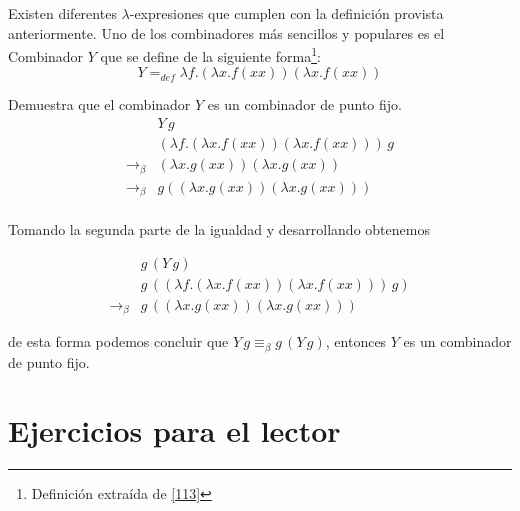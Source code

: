               
                    \begin{definition}[Combinador $Y$] Existen diferentes $\lambda$-expresiones que cumplen con la definición provista anteriormente. Uno de los combinadores más sencillos y populares es el Combinador $Y$ que se define de la siguiente forma\footnote{Definición extraída de \hyperlink{113}{[113]}}:
                        $$Y =_{def} \lambda f.(\lambda x.f(xx))(\lambda x.f(xx))$$
                    \end{definition}
    
                    \begin{exercise} Demuestra que el combinador  $Y$ es un combinador de punto fijo.
                        \[
                            \begin{array}{cl}
                            &Y\,g\\
                            &(\lambda f.(\lambda x.f(xx))(\lambda x.f(xx)))\,g\\
                            \to_\beta&(\lambda x.g(xx))(\lambda x.g(xx))\\
                            \to_\beta&g((\lambda x.g(xx))(\lambda x.g(xx)))\\
                            \end{array}
                        \]
                    
                        Tomando la segunda parte de la igualdad y desarrollando obtenemos
                    
                        \[
                            \begin{array}{cl}
                            &g\,(Y\,g)\\
                            &g\,((\lambda f.(\lambda x.f(xx))(\lambda x.f(xx)))\,g)\\
                            \to_\beta&g\,((\lambda x.g(xx))(\lambda x.g(xx)))
                            \end{array}
                        \]
                    
                        de esta forma podemos concluir que $Y \,g\equiv_\beta g\,(Y\,g)$, entonces $Y$ es un combinador de punto fijo.
                    \end{exercise}

            \section{Ejercicios para el lector}

